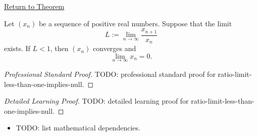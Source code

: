 \newpage
{}
\label{prf:ratio-limit-less-than-one-implies-null}

\begin{remark*}[Return]
\hyperref[thm:ratio-limit-less-than-one-implies-null]{Return to Theorem}
\end{remark*}

\begin{theorem*}
Let $(x_n)$ be a sequence of positive real numbers. Suppose that the
limit
\[
    L := \lim_{n\to\infty}\frac{x_{n+1}}{x_n}
\]
exists. If $L<1$, then $(x_n)$ converges and
\[
    \lim_{n\to\infty} x_n = 0.
\]

\smallskip
\noindent
\end{theorem*}

\begin{proof}[Professional Standard Proof]
\LRAProofBodyStart
TODO: professional standard proof for ratio-limit-less-than-one-implies-null.
\end{proof}

\begin{proof}[Detailed Learning Proof]
\LRAProofBodyStart
TODO: detailed learning proof for ratio-limit-less-than-one-implies-null.
\end{proof}

\begin{remark*}
\end{remark*}

\begin{dependencies}
\begin{itemize}
  \item TODO: list mathematical dependencies.
\end{itemize}
\end{dependencies}

\clearpage
